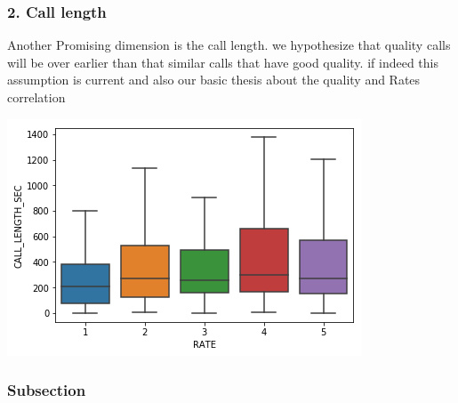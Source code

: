 \subsubsection{2. Call length}\label{call-length}

Another Promising dimension is the call length. we hypothesize that quality calls will be over earlier than that similar calls that have good quality. if indeed this assumption is current and also our basic thesis about the quality and Rates correlation  

\begin{center}
\includegraphics{figures/output_32_0.png}
\end{center}


\subsubsection{}



\subsubsection{Subsection}




